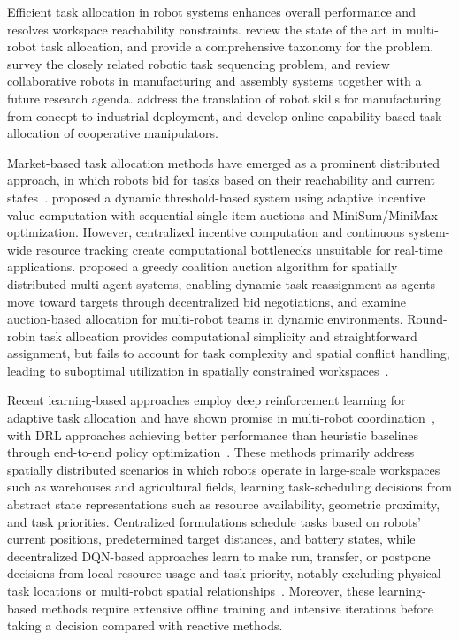 Efficient task allocation in robot systems enhances overall performance and resolves workspace
reachability constraints. \citet{khamis2015multi} review the state of the art in multi-robot task
allocation, and \citet{korsah2013comprehensive} provide a comprehensive taxonomy for the problem.
\citet{alatartsev2015robotic} survey the closely related robotic task sequencing problem, and
\citet{keshvarparast2024collaborative} review collaborative robots in manufacturing and assembly
systems together with a future research agenda. \citet{pedersen2016robot} address the translation of
robot skills for manufacturing from concept to industrial deployment, and \citet{patra2024online}
develop online capability-based task allocation of cooperative manipulators.

Market-based task allocation methods have emerged as a prominent distributed approach, in which
robots bid for tasks based on their reachability and current
states~\citep{quinton2023market,galati2023auction}. \citet{fazal2022task} proposed a dynamic
threshold-based system using adaptive incentive value computation with sequential single-item
auctions and MiniSum/MiniMax optimization. However, centralized incentive computation and continuous
system-wide resource tracking create computational bottlenecks unsuitable for real-time
applications. \citet{braquet2021greedy} proposed a greedy coalition auction algorithm for spatially
distributed multi-agent systems, enabling dynamic task reassignment as agents move toward targets
through decentralized bid negotiations, and \citet{schneider2015auction} examine auction-based
allocation for multi-robot teams in dynamic environments. Round-robin task allocation provides
computational simplicity and straightforward assignment, but fails to account for task complexity
and spatial conflict handling, leading to suboptimal utilization in spatially constrained
workspaces~\citep{alirezazadeh2024survey}.

Recent learning-based approaches employ deep reinforcement learning for adaptive task allocation and
have shown promise in multi-robot coordination~\citep{cui2024task, hao2024coordinated}, with DRL approaches achieving better performance than heuristic baselines through end-to-end policy
optimization~\citep{ma2024end,lu2024reinforcement}. These methods primarily address spatially
distributed scenarios in which robots operate in large-scale workspaces such as warehouses and
agricultural fields, learning task-scheduling decisions from abstract state representations such as
resource availability, geometric proximity, and task priorities. Centralized formulations schedule
tasks based on robots' current positions, predetermined target distances, and battery states, while
decentralized DQN-based approaches learn to make run, transfer, or postpone decisions from local
resource usage and task priority, notably excluding physical task locations or multi-robot spatial
relationships~\citep{gautier2020comparison}. Moreover, these learning-based methods require
extensive offline training and intensive iterations before taking a decision compared with reactive
methods.

